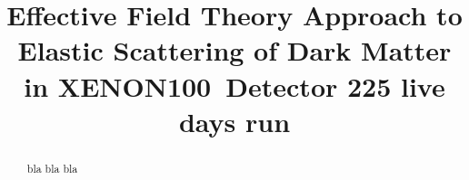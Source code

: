 \documentclass[twocolumn, showpacs, showkeys, amsmath, amssymb, floatfix]{revtex4}
\newcommand{\Xehund}{{XENON100}}
\begin{document}
\linenumbers 

\title{Effective Field Theory Approach to Elastic Scattering of Dark Matter in  \Xehund\ Detector 225 live days run}
%


\begin{abstract} 

bla bla bla

\end{abstract}

\pacs{}

\maketitle 














\end{document}
